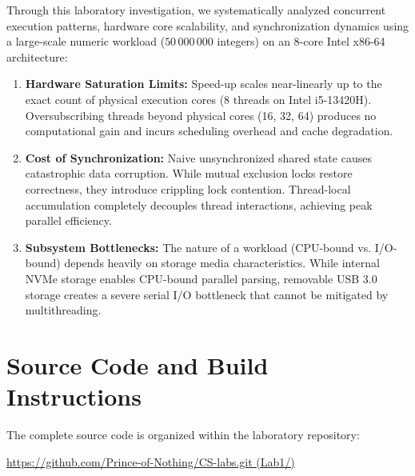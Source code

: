 \documentclass[12pt,a4paper]{article}
\begin{document}
Through this laboratory investigation, we systematically analyzed concurrent execution patterns, hardware core scalability, and synchronization dynamics using a large-scale numeric workload ($50\,000\,000$ integers) on an 8-core Intel x86-64 architecture:
\begin{enumerate}
    \item \textbf{Hardware Saturation Limits:} Speed-up scales near-linearly up to the exact count of physical execution cores (8 threads on Intel i5-13420H). Oversubscribing threads beyond physical cores (16, 32, 64) produces no computational gain and incurs scheduling overhead and cache degradation.
    \item \textbf{Cost of Synchronization:} Naive unsynchronized shared state causes catastrophic data corruption. While mutual exclusion locks restore correctness, they introduce crippling lock contention. Thread-local accumulation completely decouples thread interactions, achieving peak parallel efficiency.
    \item \textbf{Subsystem Bottlenecks:} The nature of a workload (CPU-bound vs. I/O-bound) depends heavily on storage media characteristics. While internal NVMe storage enables CPU-bound parallel parsing, removable USB 3.0 storage creates a severe serial I/O bottleneck that cannot be mitigated by multithreading.
\end{enumerate}

\section{Source Code and Build Instructions}

The complete source code is organized within the laboratory repository:
\begin{center}
\large
\url{https://github.com/Prince-of-Nothing/CS-labs.git (Lab1/)}
\end{center}
\end{document}
